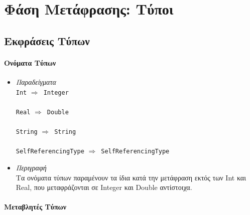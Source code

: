 \documentclass[diploma]{softlab-thesis}
\def\lra{$\Longrightarrow$\ }
\begin{document}
\section{Φάση Μετάφρασης: Τύποι}

\subsection{Εκφράσεις Τύπων}

\paragraph{Ονόματα Τύπων}

\begin{itemize}
\item
\textit{Παραδείγματα}\\

\verb|Int| \lra \verb|Integer|\\\\
\verb|Real| \lra \verb|Double|\\\\
\verb|String| \lra \verb|String|\\\\
\verb|SelfReferencingType| \lra \verb|SelfReferencingType|\\
\item
\textit{Περιγραφή}\\

Τα ονόματα τύπων παραμένουν τα ίδια κατά την μετάφραση εκτός των Int και Real,
που μεταφράζονται σε Integer και Double αντίστοιχα.

\end{itemize}

\paragraph{Μεταβλητές Τύπων}
\end{document}

